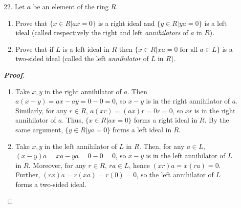\documentclass[12pt,leqno]{book}
\theoremstyle{definition}
\newenvironment{Proof}{\begin{proof}[\textnormal{\textbf{Proof}}]}{\end{proof}}
\begin{document}
\begin{enumerate}
\begin{Proof}
\end{Proof}

 \item [22.] Let $a$ be an element of the ring $R$.
  \begin{enumerate}
   \item Prove that $\{x\in R|ax=0\}$ is a right ideal and $\{y\in R|ya=0\}$ is a left ideal (called respectively the right and left \textit{annihilators} of $a$ in $R$).
   \item Prove that if $L$ is a left ideal in $R$ then $\{x\in R|xa=0\text{ for all }a\in L\}$ is a two-sided ideal (called the left \textit{annihilator} of $L$ in $R$).
  \end{enumerate}

\begin{Proof}\indent
 \begin{enumerate}
  \item Take $x,y$ in the right annihilator of $a$. Then $a(x-y)=ax-ay=0-0=0$, so $x-y$ is in the right annihilator of $a$. Similarly, for any $r\in R$, $a(xr)=(ax)r=0r=0$, so $xr$ is in the right annihilator of $a$. Thus, $\{x\in R|ax=0\}$ forms a right ideal in $R$. By the same argument, $\{y\in R|ya=0\}$ forms a left ideal in $R$.
  \item Take $x,y$ in the left annihilator of $L$ in $R$. Then, for any $a\in L$, $(x-y)a=xa-ya=0-0=0$, so $x-y$ is in the left annihilator of $L$ in $R$. Moreover, for any $r\in R$, $ra\in L$, hence $(xr)a=x(ra)=0$. Further, $(rx)a=r(xa)=r(0)=0$, so the left annihilator of $L$ forms a two-sided ideal.
 \end{enumerate}

\end{Proof}

\end{enumerate}
\end{document}
